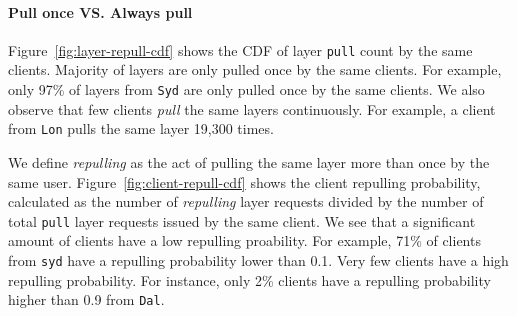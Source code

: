 \paragraph{Pull once VS. Always pull}
Figure~\ref{fig:layer-repull-cdf} shows the CDF of layer \texttt{pull} count by the same clients. 
Majority of layers are only pulled once by the same clients.
For example, only 97\% of layers from \texttt{Syd} are only pulled once by the same clients.
We also observe that few clients \emph{pull} the same layers continuously.
For example, a client from \texttt{Lon} pulls the same layer 19,300 times.

We define \emph{repulling} as the act of pulling the same layer more than once by the same user.
Figure~\ref{fig:client-repull-cdf} shows the client repulling probability, calculated as the number of \emph{repulling} layer requests divided by
the number of total \texttt{pull} layer requests issued by the same client.
We see that a significant amount of clients have a low repulling proability.
For example,
71\% of clients from \texttt{syd} have a repulling probability lower than 0.1.
Very few clients have a high repulling probability.
For instance,
only 2\% clients have a repulling probability higher than 0.9 from 
\texttt{Dal}.

